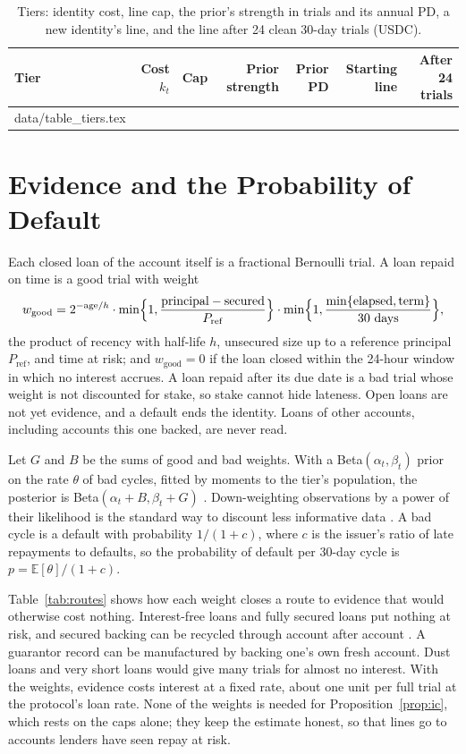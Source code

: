 \documentclass[preprint,11pt,authoryear]{elsarticle}
\makeatletter
\newcommand{\inputrows}[1]{\@@input #1 }
\makeatother
\begin{document}
\begin{table}[ht]
  \centering\small
  \caption{Tiers: identity cost, line cap, the prior's strength in trials and its annual PD, a new
  identity's line, and the line after 24 clean 30-day trials (USDC).}
  \label{tab:tiers}
  \begin{tabular}{lrrrrrr}
    \toprule
    Tier & Cost $k_t$ & Cap & Prior strength & Prior PD & Starting line & After 24 trials \\
    \midrule
    \inputrows{data/table_tiers.tex}
    \bottomrule
  \end{tabular}
\end{table}

\section{Evidence and the Probability of Default}\label{sec:evidence}

Each closed loan of the account itself is a fractional Bernoulli trial. A loan repaid on time is a
good trial with weight
\[
  w_{\mathrm{good}}=2^{-\mathrm{age}/h}\cdot\min\Bigl\{1,\frac{\text{principal}-\text{secured}}{P_{\mathrm{ref}}}\Bigr\}\cdot\min\Bigl\{1,\frac{\min\{\text{elapsed},\text{term}\}}{30\ \text{days}}\Bigr\},
\]
the product of recency with half-life $h$, unsecured size up to a reference principal
$P_{\mathrm{ref}}$, and time at risk; and $w_{\mathrm{good}}=0$ if the loan closed within the
24-hour window in which no interest accrues. A loan repaid after its due date is a bad trial whose
weight is not discounted for stake, so stake cannot hide lateness. Open loans are not yet evidence,
and a default ends the identity. Loans of other accounts, including accounts this one backed, are
never read.

Let $G$ and $B$ be the sums of good and bad weights. With a Beta$(\alpha_t,\beta_t)$ prior on the
rate $\theta$ of bad cycles, fitted by moments to the tier's population, the posterior is
Beta$(\alpha_t+B,\beta_t+G)$ \citep{gelman2013bda}. Down-weighting observations by a power of their
likelihood is the standard way to discount less informative data \citep{ibrahim2000power}. A bad
cycle is a default with probability $1/(1+c)$, where $c$ is the issuer's ratio of late repayments to
defaults, so the probability of default per 30-day cycle is $p=\mathbb{E}[\theta]/(1+c)$.

Table~\ref{tab:routes} shows how each weight closes a route to evidence that would otherwise cost
nothing. Interest-free loans and fully secured loans put nothing at risk, and secured backing can be
recycled through account after account \citep[Theorem~7.2]{conservedcredit2026}. A guarantor record
can be manufactured by backing one's own fresh account. Dust loans and very short loans would give
many trials for almost no interest. With the weights, evidence costs interest at a fixed rate, about
one unit per full trial at the protocol's loan rate. None of the weights is needed for
Proposition~\ref{prop:ic}, which rests on the caps alone; they keep the estimate honest, so that lines
go to accounts lenders have seen repay at risk.
\end{document}
